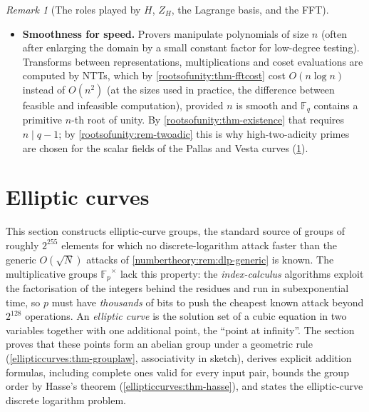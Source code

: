 \documentclass[11pt,a4paper]{article}
\theoremstyle{definition}
\theoremstyle{remark}
\newtheorem{remark}[theorem]{Remark}
\newcommand{\Fp}{\ensuremath{\mathbb{F}_{p}}}
\newcommand{\Fq}{\ensuremath{\mathbb{F}_{q}}}
\begin{document}
\begin{remark}[The roles played by \(H\), \(Z_H\), the Lagrange basis,
and the FFT]
\begin{itemize}
  cyclic ``next-row'' shift \(\omega^i \mapsto \omega^{i+1}\).
  Constraints relating a row to its neighbour become \(f(\omega X)\)
  versus \(f(X)\); permutation arguments, on which Halo~2's copy
  constraints are built, rest on the action of the group on itself and on
  its cosets. An arbitrary set of \(n\) points has none of this structure.
\item \textbf{Smoothness for speed.} Provers manipulate polynomials of
  size \(n\) (often after enlarging the domain by a small constant
  factor for low-degree testing). Transforms between representations,
  multiplications and coset evaluations are computed by NTTs, which by
  \cref{rootsofunity:thm-fftcost} cost \(O(n \log n)\) instead of
  \(O(n^2)\) (at the sizes used in practice, the difference between
  feasible and infeasible computation), provided \(n\) is smooth and
  \(\Fq\) contains a primitive \(n\)-th root of unity. By
  \cref{rootsofunity:thm-existence} that requires \(n \mid q - 1\); by
  \cref{rootsofunity:rem-twoadic} this is why high-two-adicity primes
  are chosen for the scalar fields of the Pallas and Vesta curves
  (\cref{sec:ellipticcurves}).
\end{itemize}
\end{remark}

\section{Elliptic curves}\label{sec:ellipticcurves}

This section constructs elliptic-curve groups, the standard source of
groups of roughly \(2^{255}\) elements for which no discrete-logarithm
attack faster than the generic \(O(\sqrt{N})\) attacks of
\cref{numbertheory:rem:dlp-generic} is known. The multiplicative groups
\(\Fp^\times\) lack this property: the \emph{index-calculus} algorithms
exploit the factorisation of the integers behind the residues and run in
subexponential time, so \(p\) must have \emph{thousands} of bits to push
the cheapest known attack beyond \(2^{128}\) operations. An \emph{elliptic
curve} is the solution set of a cubic equation in two variables together
with one additional point, the ``point at infinity''. The section proves
that these points form an abelian group under a geometric rule
(\cref{ellipticcurves:thm-grouplaw}, associativity in sketch), derives
explicit addition formulas, including complete ones valid for every input
pair, bounds the group order by Hasse's theorem
(\cref{ellipticcurves:thm-hasse}), and states the elliptic-curve discrete
logarithm problem.
\end{document}
